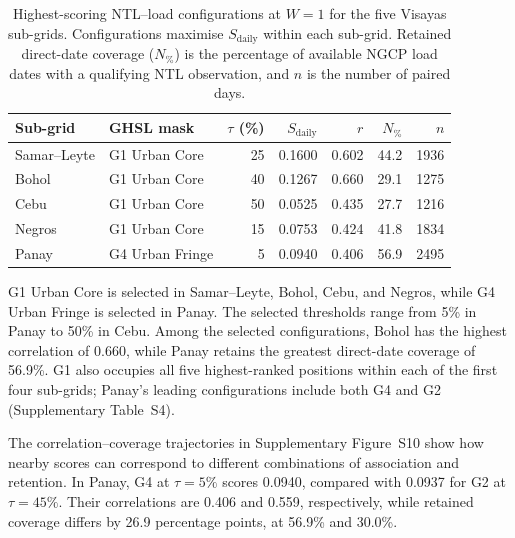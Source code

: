 \documentclass[]{interact}
\theoremstyle{plain}%
\theoremstyle{definition}
\theoremstyle{remark}
\begin{document}
    \begin{table}[!t]
        \centering
        \caption{Highest-scoring NTL--load configurations at $W=1$ for the five Visayas sub-grids. Configurations maximise $S_{\mathrm{daily}}$ within each sub-grid. Retained direct-date coverage ($N_{\%}$) is the percentage of available NGCP load dates with a qualifying NTL observation, and $n$ is the number of paired days.}
        \label{tab:transferability}
        \footnotesize
        \setlength{\tabcolsep}{4pt}
        \begin{tabular}{llrrrrr}
            \toprule
            Sub-grid & GHSL mask & $\tau$ (\%) & $S_{\mathrm{daily}}$ & $r$ & $N_{\%}$ & $n$ \\
            \midrule
            Samar--Leyte & G1 Urban Core   & 25 & 0.1600 & 0.602 & 44.2 & 1936 \\
            Bohol        & G1 Urban Core   & 40 & 0.1267 & 0.660 & 29.1 & 1275 \\
            Cebu         & G1 Urban Core   & 50 & 0.0525 & 0.435 & 27.7 & 1216 \\
            Negros       & G1 Urban Core   & 15 & 0.0753 & 0.424 & 41.8 & 1834 \\
            Panay        & G4 Urban Fringe &  5 & 0.0940 & 0.406 & 56.9 & 2495 \\
            \bottomrule
        \end{tabular}
    \end{table}
    
        G1 Urban Core is selected in Samar--Leyte, Bohol, Cebu, and Negros, while G4 Urban Fringe is selected in Panay. The selected thresholds range from 5\% in Panay to 50\% in Cebu. Among the selected configurations, Bohol has the highest correlation of 0.660, while Panay retains the greatest direct-date coverage of 56.9\%. G1 also occupies all five highest-ranked positions within each of the first four sub-grids; Panay's leading configurations include both G4 and G2 (Supplementary Table~S4).
        
        The correlation--coverage trajectories in Supplementary Figure~S10 show how nearby scores can correspond to different combinations of association and retention. In Panay, G4 at $\tau=5\%$ scores 0.0940, compared with 0.0937 for G2 at $\tau=45\%$. Their correlations are 0.406 and 0.559, respectively, while retained coverage differs by 26.9 percentage points, at 56.9\% and 30.0\%.
    
\end{document}
